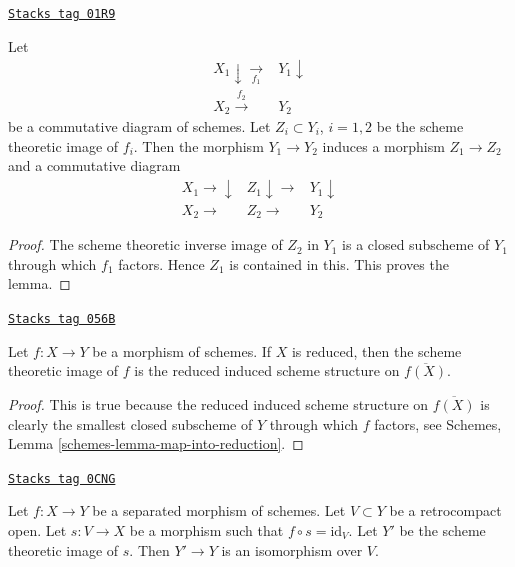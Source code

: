\begin{lemma}
\label{morphisms-lemma-factor-factor}
\href{https://stacks.math.columbia.edu/tag/01R9}{\texttt{Stacks tag 01R9}}

Let
$$
\begin{array}{cc}X_1 \downarrow\underset{f_1}{\longrightarrow} & Y_1 \downarrow \\ X_2 \overset{f_2}{\longrightarrow} & Y_2\end{array}
$$
be a commutative diagram of schemes. Let $Z_i \subset Y_i$, $i = 1, 2$ be
the scheme theoretic image of $f_i$. Then the morphism
$Y_1 \to Y_2$ induces a morphism $Z_1 \to Z_2$ and a
commutative diagram
$$
\begin{array}{ccc}X_1 \longrightarrow\downarrow & Z_1 \downarrow\longrightarrow & Y_1 \downarrow \\ X_2 \longrightarrow & Z_2 \longrightarrow & Y_2\end{array}
$$
\end{lemma}

\begin{proof}
The scheme theoretic inverse image of $Z_2$ in $Y_1$
is a closed subscheme of $Y_1$ through
which $f_1$ factors. Hence $Z_1$ is contained in this.
This proves the lemma.
\end{proof}

\begin{lemma}
\label{morphisms-lemma-scheme-theoretic-image-reduced}
\href{https://stacks.math.columbia.edu/tag/056B}{\texttt{Stacks tag 056B}}

Let $f : X \to Y$ be a morphism of schemes.
If $X$ is reduced, then the scheme theoretic image of $f$ is
the reduced induced scheme structure on $\overline{f(X)}$.
\end{lemma}

\begin{proof}
This is true because the reduced induced scheme structure on $\overline{f(X)}$
is clearly the smallest closed subscheme of $Y$ through which $f$ factors,
see
Schemes, Lemma \ref{schemes-lemma-map-into-reduction}.
\end{proof}

\begin{lemma}
\label{morphisms-lemma-scheme-theoretic-image-of-partial-section}
\href{https://stacks.math.columbia.edu/tag/0CNG}{\texttt{Stacks tag 0CNG}}

Let $f : X \to Y$ be a separated morphism of schemes.
Let $V \subset Y$ be a retrocompact open. Let $s : V \to X$
be a morphism such that $f \circ s = \text{id}_V$.
Let $Y'$ be the scheme theoretic image of $s$.
Then $Y' \to Y$ is an isomorphism over $V$.
\end{lemma}

